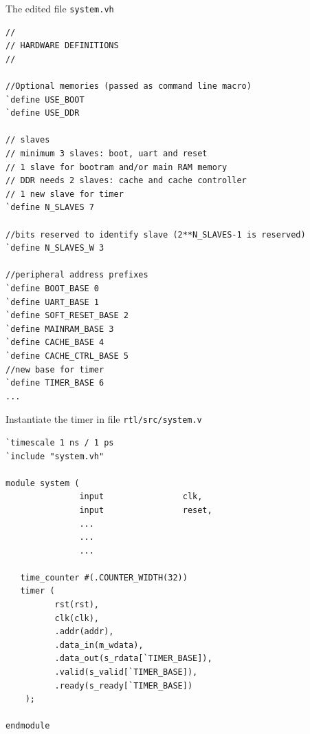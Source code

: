 \documentclass [xcolor=svgnames, t] {beamer}
\begin{document}
\begin{frame}[fragile]{The edited file {\tt system.vh}}
\begin{tiny}
\begin{lstlisting}
//
// HARDWARE DEFINITIONS
//

//Optional memories (passed as command line macro)
`define USE_BOOT
`define USE_DDR

// slaves
// minimum 3 slaves: boot, uart and reset
// 1 slave for bootram and/or main RAM memory
// DDR needs 2 slaves: cache and cache controller
// 1 new slave for timer
`define N_SLAVES 7

//bits reserved to identify slave (2**N_SLAVES-1 is reserved)
`define N_SLAVES_W 3

//peripheral address prefixes
`define BOOT_BASE 0
`define UART_BASE 1
`define SOFT_RESET_BASE 2
`define MAINRAM_BASE 3
`define CACHE_BASE 4
`define CACHE_CTRL_BASE 5
//new base for timer
`define TIMER_BASE 6
...
\end{lstlisting}
\end{tiny}
\end{frame}

\begin{frame}[fragile]{Instantiate the timer in file {\tt rtl/src/system.v}}
\begin{tiny}
\begin{lstlisting}
`timescale 1 ns / 1 ps
`include "system.vh"

module system (
               input                clk,
               input                reset,
               ...
               ...
               ...

   time_counter #(.COUNTER_WIDTH(32))
   timer (
          rst(rst),
          clk(clk),
          .addr(addr),
          .data_in(m_wdata),
          .data_out(s_rdata[`TIMER_BASE]),
          .valid(s_valid[`TIMER_BASE]),
          .ready(s_ready[`TIMER_BASE])
    );

endmodule

\end{lstlisting}
\end{tiny}
\end{frame}
\end{document}
